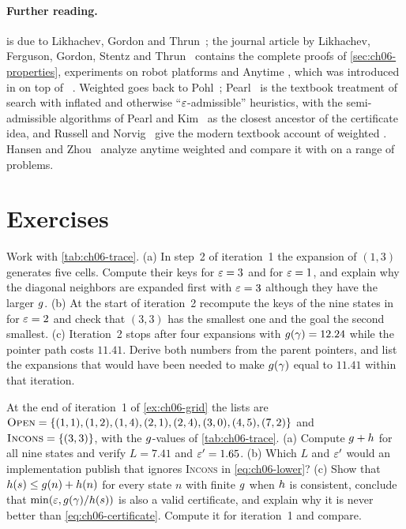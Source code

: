 \paragraph{Further reading.}
\arastar is due to Likhachev, Gordon and Thrun~\cite{likhachev2003ara}; the
journal article by Likhachev, Ferguson, Gordon, Stentz and
Thrun~\cite{likhachev2008anytime} contains the complete proofs of
\cref{sec:ch06-properties}, experiments on robot platforms and Anytime
\dstar, which was introduced in \cite{likhachev2005anytime} on top of
\dstarlite~\cite{koenig2002dstarlite}. Weighted \astar goes back to
Pohl~\cite{pohl1970heuristic}; Pearl~\cite{pearl1984heuristics} is the
textbook treatment of search with inflated and otherwise
``$\varepsilon$-admissible'' heuristics, with the semi-admissible algorithms of
Pearl and Kim~\cite{pearl1982studies} as the closest ancestor of the
certificate idea, and Russell and Norvig~\cite{russell2020aima} give the
modern textbook account of weighted \astar. Hansen and
Zhou~\cite{hansen2007anytime} analyze anytime weighted \astar and compare it
with \arastar on a range of problems.

\section{Exercises}
\label{sec:ch06-exercises}

\begin{exercise}[\difficulty{1}]
\label{exr:ch06-trace}
Work with \cref{tab:ch06-trace}. (a) In step~2 of iteration~1 the expansion of
$(1,3)$ generates five cells. Compute their keys for $\varepsilon = 3$ and for
$\varepsilon = 1$, and explain why the diagonal neighbors are expanded first with
$\varepsilon = 3$ although they have the larger $g$. (b) At the start of
iteration~2 recompute the keys of the nine states in \Open for $\varepsilon = 2$ and
check that $(3,3)$ has the smallest one and the goal the second smallest.
(c) Iteration~2 stops after four expansions with $g(\gamma) = 12.24$
while the pointer path costs $11.41$. Derive both numbers from the parent
pointers, and list the expansions that would have been needed to make
$g(\gamma)$ equal to $11.41$ within that iteration.
\end{exercise}

\begin{exercise}[\difficulty{1}]
\label{exr:ch06-bound}
At the end of iteration~1 of \cref{ex:ch06-grid} the lists are
$\textsc{Open} = \{(1,1), (1,2), (1,4), (2,1), (2,4), (3,0), (4,5), (7,2)\}$ and
$\textsc{Incons} = \{(3,3)\}$, with the $g$-values of
\cref{tab:ch06-trace}. (a) Compute $g + h$ for all nine states and
verify $L = 7.41$ and $\varepsilon' = 1.65$. (b) Which $L$ and $\varepsilon'$ would an
implementation publish that ignores \textsc{Incons} in
\cref{eq:ch06-lower}? (c) Show that $h(s) \le g(n) + h(n)$ for
every state $n$ with finite $g$ when $h$ is consistent, conclude
that $\min(\varepsilon, g(\gamma)/h(s))$ is also a valid certificate, and
explain why it is never better than \cref{eq:ch06-certificate}. Compute it
for iteration~1 and compare.
\end{exercise}


